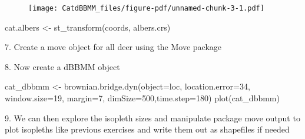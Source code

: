 \documentclass[
  letterpaper,
]{book}
\newenvironment{Shaded}{\begin{snugshade}}{\end{snugshade}}
\newcommand{\AttributeTok}[1]{\textcolor[rgb]{0.40,0.45,0.13}{#1}}
\newcommand{\CommentTok}[1]{\textcolor[rgb]{0.37,0.37,0.37}{#1}}
\newcommand{\ConstantTok}[1]{\textcolor[rgb]{0.56,0.35,0.01}{#1}}
\newcommand{\DecValTok}[1]{\textcolor[rgb]{0.68,0.00,0.00}{#1}}
\newcommand{\FunctionTok}[1]{\textcolor[rgb]{0.28,0.35,0.67}{#1}}
\newcommand{\NormalTok}[1]{\textcolor[rgb]{0.00,0.23,0.31}{#1}}
\newcommand{\OtherTok}[1]{\textcolor[rgb]{0.00,0.23,0.31}{#1}}
\newcommand{\SpecialCharTok}[1]{\textcolor[rgb]{0.37,0.37,0.37}{#1}}
\begin{document}
\begin{figure}[H]

{\centering \texttt{[image: CatdBBMM\_files/figure-pdf/unnamed-chunk-3-1.pdf]}

}

\end{figure}

\begin{Shaded}
\begin{Highlighting}[]
\NormalTok{cat.albers }\OtherTok{\textless{}{-}} \FunctionTok{st\_transform}\NormalTok{(coords, albers.crs)}
\end{Highlighting}
\end{Shaded}

7. Create a move object for all deer using the Move package

\begin{Shaded}
\end{Shaded}

8. Now create a dBBMM object

\begin{Shaded}
\begin{Highlighting}[]
\NormalTok{cat\_dbbmm }\OtherTok{\textless{}{-}} \FunctionTok{brownian.bridge.dyn}\NormalTok{(}\AttributeTok{object=}\NormalTok{loc, }\AttributeTok{location.error=}\DecValTok{34}\NormalTok{, }\AttributeTok{window.size=}\DecValTok{19}\NormalTok{, }\AttributeTok{margin=}\DecValTok{7}\NormalTok{,}
\AttributeTok{dimSize=}\DecValTok{500}\NormalTok{,}\AttributeTok{time.step=}\DecValTok{180}\NormalTok{)}
\FunctionTok{plot}\NormalTok{(cat\_dbbmm)}
\end{Highlighting}
\end{Shaded}

9. We can then explore the isopleth sizes and manipulate package move
output to plot isopleths like previous exercises and write them out as
shapefiles if needed
\end{document}
